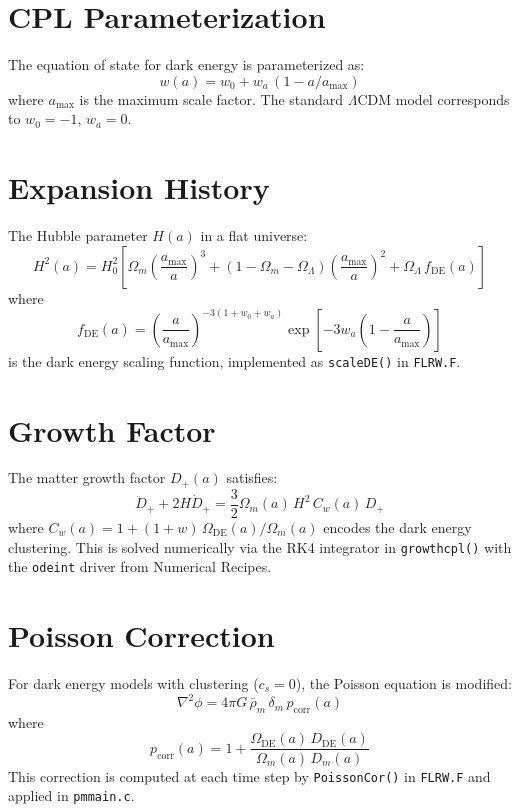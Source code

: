 \documentclass[11pt,fleqn]{book}
\newcommand{\code}[1]{\texttt{#1}}
\newcommand{\file}[1]{\texttt{#1}}
\begin{document}
\section{CPL Parameterization}

The equation of state for dark energy is parameterized as:
\begin{equation}
  w(a) = w_0 + w_a\,(1 - a/a_\text{max})
\end{equation}
where $a_\text{max}$ is the maximum scale factor.  The standard $\Lambda$CDM model corresponds to $w_0 = -1$, $w_a = 0$.

\section{Expansion History}

The Hubble parameter $H(a)$ in a flat universe:
\begin{equation}
  H^2(a) = H_0^2\left[\Omega_m\left(\frac{a_\text{max}}{a}\right)^3 + (1-\Omega_m-\Omega_\Lambda)\left(\frac{a_\text{max}}{a}\right)^2 + \Omega_\Lambda\,f_\text{DE}(a)\right]
\end{equation}
where
\begin{equation}
  f_\text{DE}(a) = \left(\frac{a}{a_\text{max}}\right)^{-3(1+w_0+w_a)}\exp\!\left[-3w_a\left(1 - \frac{a}{a_\text{max}}\right)\right]
\end{equation}
is the dark energy scaling function, implemented as \code{scaleDE()} in \file{FLRW.F}.

\section{Growth Factor}

The matter growth factor $D_+(a)$ satisfies:
\begin{equation}
  \ddot{D}_+ + 2H\dot{D}_+ = \frac{3}{2}\Omega_m(a)\,H^2\,C_w(a)\,D_+
\end{equation}
where $C_w(a) = 1 + (1+w)\,\Omega_\text{DE}(a)/\Omega_m(a)$ encodes the dark energy clustering.  This is solved numerically via the RK4 integrator in \code{growthcpl()} with the \code{odeint} driver from Numerical Recipes.

\section{Poisson Correction}

For dark energy models with clustering ($c_s = 0$), the Poisson equation is modified:
\begin{equation}
  \nabla^2\phi = 4\pi G\,\bar\rho_m\,\delta_m\,p_\text{corr}(a)
\end{equation}
where
\begin{equation}
  p_\text{corr}(a) = 1 + \frac{\Omega_\text{DE}(a)\,D_\text{DE}(a)}{\Omega_m(a)\,D_m(a)}
\end{equation}
This correction is computed at each time step by \code{PoissonCor()} in \file{FLRW.F} and applied in \code{pmmain.c}.
\end{document}
